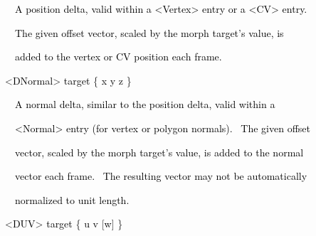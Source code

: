 \documentclass[a4paper]{article}
\newcommand\textstyleOOoComputerKeyWord[1]{\textrm{\textcolor[rgb]{0.0,0.0,0.5019608}{#1}}}
\newcommand\textstyleOOoAssemblerSpecialChar[1]{\textrm{\textcolor[rgb]{0.0,0.5019608,0.0}{#1}}}
\newcommand\textstyleOOoAssemblerIdent[1]{\textrm{\textcolor{black}{#1}}}
\begin{document}
\bigskip

{\color{black}
\textstyleOOoComputerKeyWord{\textcolor{black}{\ \ A position delta, valid within a {\textless}Vertex{\textgreater}
entry or a {\textless}CV{\textgreater} entry.}}}

{\color{black}
\textstyleOOoComputerKeyWord{\textcolor{black}{\ \ The given offset vector, scaled by the morph target's value, is}}}

{\color{black}
\textstyleOOoComputerKeyWord{\textcolor{black}{\ \ added to the vertex or CV position each frame.}}}


\bigskip


\bigskip

{\color{black}
\textstyleOOoAssemblerSpecialChar{{\textless}}\textstyleOOoAssemblerIdent{DNormal}\textstyleOOoAssemblerSpecialChar{{\textgreater}}\textstyleOOoComputerKeyWord{\textcolor{black}{
}}\textstyleOOoAssemblerIdent{target}\textstyleOOoComputerKeyWord{\textcolor{black}{
}}\textstyleOOoAssemblerSpecialChar{\{}\textstyleOOoComputerKeyWord{\textcolor{black}{
}}\textstyleOOoAssemblerIdent{x}\textstyleOOoComputerKeyWord{\textcolor{black}{
}}\textstyleOOoAssemblerIdent{y}\textstyleOOoComputerKeyWord{\textcolor{black}{
}}\textstyleOOoAssemblerIdent{z}\textstyleOOoComputerKeyWord{\textcolor{black}{
}}\textstyleOOoAssemblerSpecialChar{\}}}


\bigskip

{\color{black}
\textstyleOOoComputerKeyWord{\textcolor{black}{\ \ A normal delta, similar to the position delta, valid within a}}}

{\color{black}
\textstyleOOoComputerKeyWord{\textcolor{black}{\ \ {\textless}Normal{\textgreater} entry (for vertex or polygon
normals). \ The given offset}}}

{\color{black}
\textstyleOOoComputerKeyWord{\textcolor{black}{\ \ vector, scaled by the morph target's value, is added to the normal}}}

{\color{black}
\textstyleOOoComputerKeyWord{\textcolor{black}{\ \ vector each frame. \ The resulting vector may not be automatically}}}

{\color{black}
\textstyleOOoComputerKeyWord{\textcolor{black}{\ \ normalized to unit length.}}}


\bigskip

{\color{black}
\textstyleOOoAssemblerSpecialChar{{\textless}}\textstyleOOoAssemblerIdent{DUV}\textstyleOOoAssemblerSpecialChar{{\textgreater}}\textstyleOOoComputerKeyWord{\textcolor{black}{
}}\textstyleOOoAssemblerIdent{target}\textstyleOOoComputerKeyWord{\textcolor{black}{
}}\textstyleOOoAssemblerSpecialChar{\{}\textstyleOOoComputerKeyWord{\textcolor{black}{
}}\textstyleOOoAssemblerIdent{u}\textstyleOOoComputerKeyWord{\textcolor{black}{
}}\textstyleOOoAssemblerIdent{v}\textstyleOOoComputerKeyWord{\textcolor{black}{
}}\textstyleOOoAssemblerSpecialChar{[}\textstyleOOoAssemblerIdent{w}\textstyleOOoAssemblerSpecialChar{]}\textstyleOOoComputerKeyWord{\textcolor{black}{
}}\textstyleOOoAssemblerSpecialChar{\}}}
\end{document}

